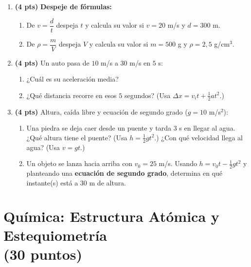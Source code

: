 \documentclass[12pt, letterpaper]{article}
\begin{document}
\begin{enumerate}[leftmargin=*]
  \item \textbf{(4 pts)} \textbf{Despeje de fórmulas:}
        \begin{enumerate}[label=\alph*)]
          \item De $v = \dfrac{d}{t}$ despeja $t$ y calcula su valor si $v = 20$ m/s y $d = 300$ m.
          \item De $\rho = \dfrac{m}{V}$ despeja $V$ y calcula su valor si $m = 500$ g y $\rho = 2{,}5$ g/cm$^3$.
        \end{enumerate}

  \item \textbf{(4 pts)} Un auto pasa de $10$ m/s a $30$ m/s en $5$ s:
        \begin{enumerate}[label=\alph*)]
          \item ¿Cuál es su aceleración media?
          \item ¿Qué distancia recorre en esos $5$ segundos? (Usa $\Delta x = v_i t + \tfrac{1}{2} a t^2$.)
        \end{enumerate}

  \item \textbf{(4 pts)} Altura, caída libre y ecuación de segundo grado ($g = 10$ m/s$^2$):
        \begin{enumerate}[label=\alph*)]
          \item Una piedra se deja caer desde un puente y tarda $3$ s en llegar al agua. ¿Qué altura tiene el puente? (Usa $h = \tfrac{1}{2} g t^2$.) ¿Con qué velocidad llega al agua? (Usa $v = g t$.)
          \item Un objeto se lanza hacia arriba con $v_0 = 25$ m/s. Usando $h = v_0 t - \tfrac{1}{2} g t^2$ y planteando una \textbf{ecuación de segundo grado}, determina en qué instante(s) está a $30$ m de altura.
        \end{enumerate}
\end{enumerate}

\section{Química: Estructura Atómica y Estequiometría\\(30 puntos)}
\end{document}
